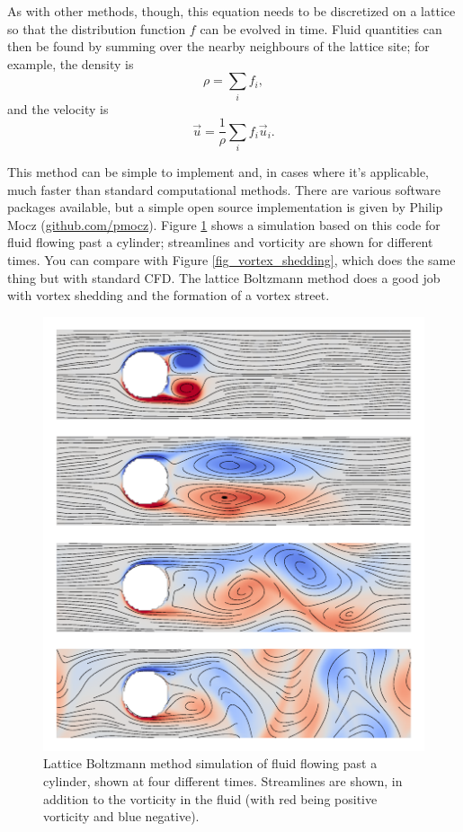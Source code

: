 As with other methods, though, this equation needs to be discretized on a lattice so that the distribution function $f$ can be evolved in time.  Fluid quantities can then be found by summing over the nearby neighbours of the lattice site; for example, the density is
\[
\rho = \sum_i f_i,
\]
and the velocity is
\[
\vec{u} = \frac{1}{\rho} \sum_i f_i \vec{u}_i.
\]

This method can be simple to implement and, in cases where it's applicable, much faster than standard computational methods.  There are various software packages available, but a simple open source implementation is given by Philip Mocz (\href{https://github.com/pmocz/latticeboltzmann-python}{github.com/pmocz}).  Figure \ref{fig_lbm} shows a simulation based on this code for fluid flowing past a cylinder; streamlines and vorticity are shown for different times.  You can compare with Figure \ref{fig_vortex_shedding}, which does the same thing but with standard CFD.  The lattice Boltzmann method does a good job with vortex shedding and the formation of a vortex street.

\begin{figure}
\centering
\includegraphics[width=0.8\linewidth]{Figures/Chapter6/fig_lbm}
\caption{Lattice Boltzmann method simulation of fluid flowing past a cylinder, shown at four different times.  Streamlines are shown, in addition to the vorticity in the fluid (with red being positive vorticity and blue negative).}
\label{fig_lbm}
\end{figure}

